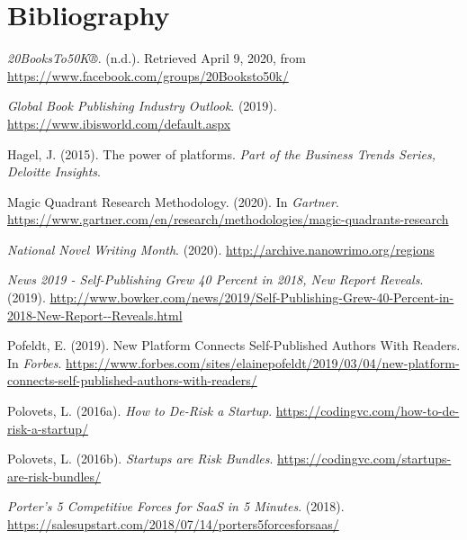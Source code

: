 \documentclass[10pt,openany]{book}
\newlength{\cslhangindent}
\newenvironment{cslreferences}%
  {\setlength{\parindent}{0pt}%
  \everypar{\setlength{\hangindent}{\cslhangindent}}\ignorespaces}%
  {\par}
\begin{document}
\hypertarget{bibliography}{%
\section*{Bibliography}\label{bibliography}}

\hypertarget{refs}{}
\begin{cslreferences}
\leavevmode\hypertarget{ref-noauthor_20booksto50k_nodate}{}%
\emph{20BooksTo50K®}. (n.d.). Retrieved April 9, 2020, from
\url{https://www.facebook.com/groups/20Booksto50k/}

\leavevmode\hypertarget{ref-noauthor_ibisworld_nodate}{}%
\emph{Global Book Publishing Industry Outlook}. (2019).
\url{https://www.ibisworld.com/default.aspx}

\leavevmode\hypertarget{ref-hagel_power_2015}{}%
Hagel, J. (2015). The power of platforms. \emph{Part of the Business
Trends Series, Deloitte Insights}.

\leavevmode\hypertarget{ref-gartner_magic_nodate}{}%
Magic Quadrant Research Methodology. (2020). In \emph{Gartner}.
\url{https://www.gartner.com/en/research/methodologies/magic-quadrants-research}

\leavevmode\hypertarget{ref-noauthor_national_nodate}{}%
\emph{National Novel Writing Month}. (2020).
\url{http://archive.nanowrimo.org/regions}

\leavevmode\hypertarget{ref-bowker_news_nodate}{}%
\emph{News 2019 - Self-Publishing Grew 40 Percent in 2018, New Report
Reveals}. (2019).
\url{http://www.bowker.com/news/2019/Self-Publishing-Grew-40-Percent-in-2018-New-Report--Reveals.html}

\leavevmode\hypertarget{ref-pofeldt_new_nodate}{}%
Pofeldt, E. (2019). New Platform Connects Self-Published Authors With
Readers. In \emph{Forbes}.
\url{https://www.forbes.com/sites/elainepofeldt/2019/03/04/new-platform-connects-self-published-authors-with-readers/}

\leavevmode\hypertarget{ref-polovets_how_nodate}{}%
Polovets, L. (2016a). \emph{How to De-Risk a Startup}.
\url{https://codingvc.com/how-to-de-risk-a-startup/}

\leavevmode\hypertarget{ref-polovets_startups_nodate}{}%
Polovets, L. (2016b). \emph{Startups are Risk Bundles}.
\url{https://codingvc.com/startups-are-risk-bundles/}

\leavevmode\hypertarget{ref-annelise_porters_nodate}{}%
\emph{Porter's 5 Competitive Forces for SaaS in 5 Minutes}. (2018).
\url{https://salesupstart.com/2018/07/14/porters5forcesforsaas/}


\end{cslreferences}
\end{document}
